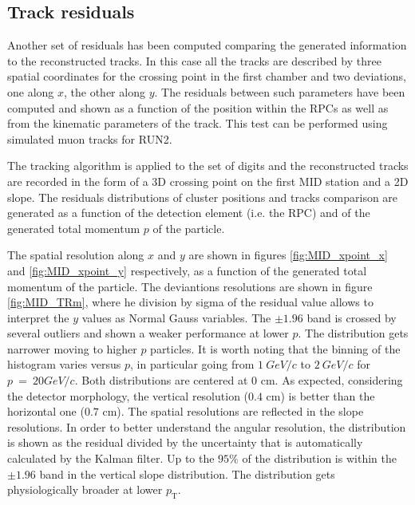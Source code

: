 \subsection{Track residuals}
Another set of residuals has been computed comparing the generated information to the reconstructed tracks.
In this case all the tracks are described by three spatial coordinates for the crossing point in the first chamber and two deviations, one along $x$, the other along $y$.
The residuals between such parameters have been computed and shown as a function of the position within the RPCs as well as from the kinematic parameters of the track.
This test can be performed using simulated muon tracks for RUN2.

The tracking algorithm is applied to the set of digits and the reconstructed tracks are recorded in the form of a 3D crossing point on the first MID station and a 2D slope.
The residuals distributions of cluster positions and tracks comparison are generated as a function of the detection element (i.e. the RPC) and of the generated total momentum $p$ of the particle.

The spatial resolution along $x$ and $y$ are shown in figures \ref{fig:MID_xpoint_x} and \ref{fig:MID_xpoint_y} respectively, as a function of the generated total momentum of the particle.
The deviantions resolutions are shown in figure \ref{fig:MID_TRm}, where he division by sigma of the residual value allows to interpret the $y$ values as Normal Gauss variables. 
The $\pm1.96$ band is crossed by several outliers and shown a weaker performance at lower $p$.
The distribution gets narrower moving to higher $p$ particles.
It is worth noting that the binning of the histogram varies versus $p$, in particular going from $1\ GeV/c$ to $2\ GeV/c$ for $p\ =\ 20 GeV/c$.
Both distributions are centered at $0$ cm.
As expected, considering the detector morphology, the vertical resolution ($0.4$ cm) is better than the horizontal one ($0.7$ cm).
The spatial resolutions are reflected in the slope resolutions.
In order to better understand the angular resolution, the distribution is shown as the residual divided by the uncertainty that is automatically calculated by the Kalman filter.
Up to the $95\%$ of the distribution is within the $\pm1.96$ band in the vertical slope distribution.
The distribution gets physiologically broader at lower $p_\mathrm{T}$.

